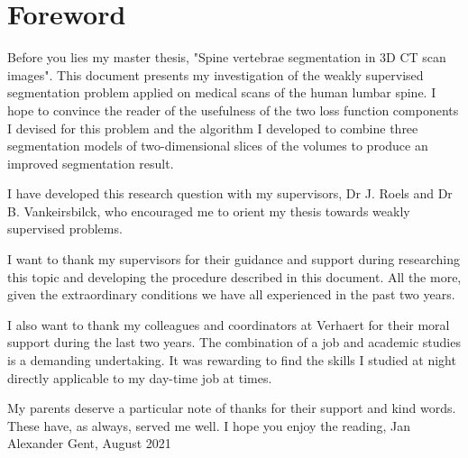 \chapter*{Foreword}

\par{
Before you lies my master thesis, "Spine vertebrae segmentation in 3D CT scan images".
This document presents my investigation of the weakly supervised segmentation problem applied on medical scans of the human lumbar spine.
I hope to convince the reader of the usefulness of the two loss function components I devised for this problem and the algorithm I developed to combine three segmentation models of two-dimensional slices of the volumes to produce an improved segmentation result.
}
\par{
I have developed this research question with my supervisors, Dr J. Roels and Dr B. Vankeirsbilck, who encouraged me to orient my thesis towards weakly supervised problems.
}
\par{
I want to thank my supervisors for their guidance and support during researching this topic and developing the procedure described in this document.
All the more, given the extraordinary conditions we have all experienced in the past two years.
}
\par{
I also want to thank my colleagues and coordinators at Verhaert for their moral support during the last two years.
The combination of a job and academic studies is a demanding undertaking.
It was rewarding to find the skills I studied at night directly applicable to my day-time job at times. 
}
\par{
My parents deserve a particular note of thanks for their support and kind words. These have, as always, served me well.
}\newline
\vspace{1cm}
I hope you enjoy the reading,\newline
Jan Alexander\newline
\vspace{1cm}
Gent, August 2021
\clearpage\null\newpage